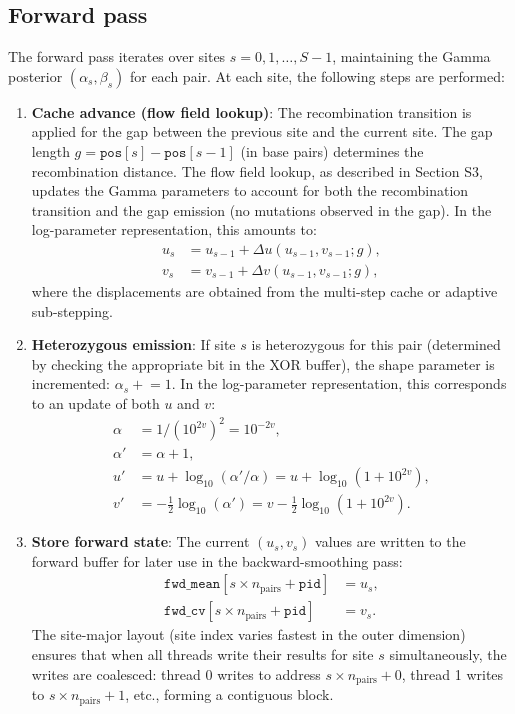 \documentclass[10pt,letterpaper]{article}
\begin{document}
\subsection{Forward pass}

The forward pass iterates over sites $s = 0, 1, \ldots, S-1$, maintaining the Gamma posterior $(\alpha_s, \beta_s)$ for each pair. At each site, the following steps are performed:

\begin{enumerate}
\item \textbf{Cache advance (flow field lookup)}: The recombination transition is applied for the gap between the previous site and the current site. The gap length $g = \texttt{pos}[s] - \texttt{pos}[s-1]$ (in base pairs) determines the recombination distance. The flow field lookup, as described in Section S3, updates the Gamma parameters to account for both the recombination transition and the gap emission (no mutations observed in the gap). In the log-parameter representation, this amounts to:
\begin{align}
u_s &= u_{s-1} + \Delta u(u_{s-1}, v_{s-1}; g), \\
v_s &= v_{s-1} + \Delta v(u_{s-1}, v_{s-1}; g),
\end{align}
where the displacements are obtained from the multi-step cache or adaptive sub-stepping.

\item \textbf{Heterozygous emission}: If site $s$ is heterozygous for this pair (determined by checking the appropriate bit in the XOR buffer), the shape parameter is incremented: $\alpha_s \mathrel{+}= 1$. In the log-parameter representation, this corresponds to an update of both $u$ and $v$:
\begin{align}
\alpha &= 1 / (10^{2v})^2 = 10^{-2v}, \\
\alpha' &= \alpha + 1, \\
u' &= u + \log_{10}(\alpha'/\alpha) = u + \log_{10}(1 + 10^{2v}), \\
v' &= -\tfrac{1}{2}\log_{10}(\alpha') = v - \tfrac{1}{2}\log_{10}(1 + 10^{2v}).
\end{align}

\item \textbf{Store forward state}: The current $(u_s, v_s)$ values are written to the forward buffer for later use in the backward-smoothing pass:
\begin{align}
\texttt{fwd\_mean}[s \times n_{\mathrm{pairs}} + \texttt{pid}] &= u_s, \\
\texttt{fwd\_cv}[s \times n_{\mathrm{pairs}} + \texttt{pid}] &= v_s.
\end{align}
The site-major layout (site index varies fastest in the outer dimension) ensures that when all threads write their results for site $s$ simultaneously, the writes are coalesced: thread 0 writes to address $s \times n_{\mathrm{pairs}} + 0$, thread 1 writes to $s \times n_{\mathrm{pairs}} + 1$, etc., forming a contiguous block.
\end{enumerate}
\end{document}
